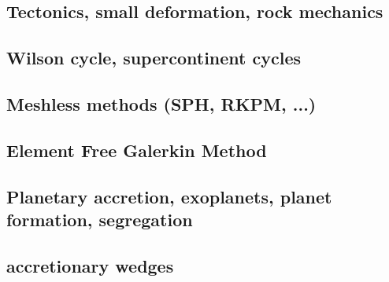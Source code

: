 \subsection*{Tectonics, small deformation, rock mechanics}

\cite{ilma93}
\cite{hept96}
\cite{esfm08}
\cite{lega12}

\subsection*{Wilson cycle, supercontinent cycles}

\cite{trry95}
\cite{zhzl07}
\cite{zhzm09}
\cite{begb19}


\subsection*{Meshless methods (SPH, RKPM, ...)}

\cite{beko96}
\cite{febh05}
\cite{nifs15}

\subsection*{Element Free Galerkin Method}

\cite{belg95a}
\cite{belg95b}
\cite{bekf96}
\cite{bekk97}




\subsection*{Planetary accretion, exoplanets, planet formation, segregation}

\cite{ligt09}\cite{gogk09}
\cite{gobg14}

\subsection*{accretionary wedges} 

\cite{mauw16}
\cite{mauw17}

